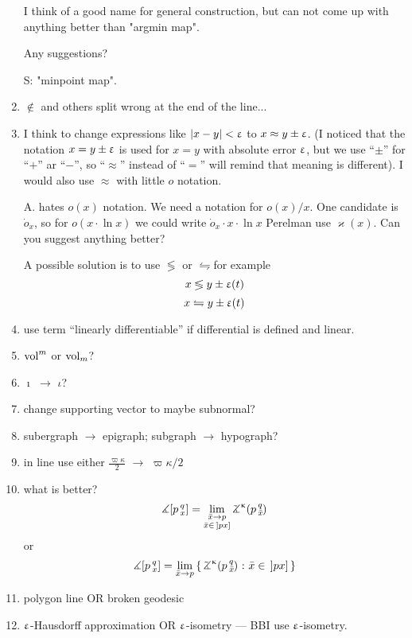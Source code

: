 \begin{enumerate}
I think of a good name for general construction,
but can not come up with anything better than
"argmin map".

Any suggestions?

S: "minpoint map".

\item $\not\in$ and others split wrong at the end of the line...

\item I think to change expressions like $|x-y|<\upvarepsilon$ to $x\approx y\pm \eps$.
(I noticed that the notation $x=y\pm \upvarepsilon$ is used for $x=y$ with absolute error $\upvarepsilon$,
but we use ``$\pm$'' for ``$+$'' ar ``$-$'', so ``$\approx$'' instead of ``$=$'' will remind that meaning is different).
\subitem I would also use $\approx$ with little $o$ notation.

\subitem A. hates $o(x)$ notation.
We need a notation for $o(x)/x$. 
One candidate is $\dot o_x$, so for $o(x\cdot\ln x)$ we could write $\dot o_x\cdot x\cdot\ln x$ 
Perelman use $\varkappa(x)$.
Can you suggest anything better?


\subitem A possible solution is to use $\lessgtr$ or $\leftrightharpoons$for example
\[x\lessgtr y\pm \upvarepsilon(t)\]
\[x\leftrightharpoons y\pm \upvarepsilon(t)\]
\item use term ``linearly differentiable'' if differential is defined and linear.

\item $\mathop{\rm vol}\nolimits^m$ or $\mathop{\rm vol}\nolimits_m$?

\item $\imath$ $\to$ $\iota$?

\item change supporting vector to maybe subnormal?

\item subergraph $\to$ epigraph; subgraph $\to$ hypograph? 

\item in line use either $\tfrac{\varpi\kappa}{2}$ $\to$ $\varpi\kappa/2$

\item what is better?
\[\mangle\hinge p q x
=
\lim_{
\substack{
\bar x\to p
\\
\bar x\in\,\mathopen{]}px]}}\angk\kappa p q{\bar x}\]
or 
\[\mangle\hinge p q x
=
\lim_{\bar x\to p}
\set{\angk\kappa p q{\bar x}}{\bar x\in\,\mathopen{]}px]}\]

\item polygon line OR broken geodesic

\item $\upvarepsilon$-Hausdorff approximation OR $\upvarepsilon$-isometry --- BBI use  $\upvarepsilon$-isometry.


\end{enumerate}
